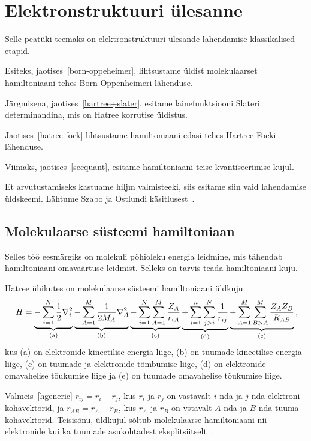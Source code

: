 \documentclass[12pt]{report}
\begin{document}
\chapter{Elektronstruktuuri ülesanne}\label{chap:esp}

Selle peatüki teemaks on elektronstruktuuri ülesande lahendamise klassikalised etapid.

Esiteks, jaotises~\ref{born-oppeheimer}, lihtsustame üldist molekulaarset hamiltoniaani tehes Born-Oppenheimeri lähenduse.

Järgmisena, jaotises~\ref{hartree+slater}, esitame lainefunktsiooni Slateri determinandina, mis on Hatree korrutise üldistus.

Jaotises~\ref{hatree-fock} lihtsustame hamiltoniaani edasi tehes Hartree-Focki lähenduse.

Viimaks, jaotises~\ref{secquant}, esitame hamiltoniaani teise kvantiseerimise kujul.

Et arvutustamiseks kastuame hiljm valmisteeki, siis esitame siin vaid
lahendamise üldskeemi. Lähtume Szabo ja Ostlundi
käsitlusest~\cite{szabo+ostlund}.


\section{Molekulaarse süsteemi hamiltoniaan}

Selles töö eesmärgiks on molekuli põhioleku energia leidmine, mis tähendab
hamiltoniaani omaväärtuse leidmist. Selleks on tarvis teada hamiltoniaani kuju.

Hatree ühikutes on molekulaarse süsteemi hamiltoniaani üldkuju
\begin{equation}\label{hgeneric}
    H = \underbrace{-\sum_{i=1}^N\frac{1}{2}\nabla_i^2}_\mathrm{(a)}
        \underbrace{-\sum_{A=1}^M\frac{1}{2M_A}\nabla_A^2}_\mathrm{(b)}
        \underbrace{-\sum_{i=1}^N\sum_{A=1}^M\frac{Z_A}{r_{iA}}}_\mathrm{(c)}
        \underbrace{+\sum_{i=1}^n\sum_{j>i}^N\frac{1}{r_{ij}}}_\mathrm{(d)}
        \underbrace{+\sum_{A=1}^M\sum_{B>A}^M\frac{Z_AZ_B}{R_{AB}}}_\mathrm{(e)}\rlap{,}
\end{equation}
kus (a) on elektronide kineetilise energia liige, (b) on tuumade kineetilise energia liige, (c) on tuumade ja elektronide tõmbumise liige, (d) on elektronide omavahelise tõukumise liige ja (e) on tuumade omavahelise tõukumise liige.

Valmeis~\eqref{hgeneric} \(r_{ij} = r_i - r_j\), kus \(r_i\) ja \(r_j\) on vastavalt \(i\)-nda ja \(j\)-nda elektroni kohavektorid, ja \(r_{AB} = r_A - r_B\), kus \(r_A\) ja \(r_B\) on vstavalt \(A\)-nda ja \(B\)-nda tuuma kohavektorid.
Teisisõnu, üldkujul sõltub molekulaarse hamiltoniaani nii elektronide kui ka tuumade asukohtadest eksplitsiitselt~\cite{szabo+ostlnud}.
\end{document}
